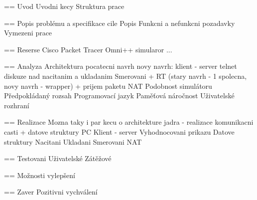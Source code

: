 

== Uvod
Uvodni kecy
Struktura prace

== Popis problému a specifikace cile
Popis
Funkcni a nefunkcni pozadavky
Vymezeni prace

== Reserse
Cisco Packet Tracer
Omni++ simularor
...

== Analyza
Architektura
  pocatecni navrh
  novy navrh: klient - server
  telnet
  diskuze nad nacitanim a ukladanim
  Smerovani + RT (stary navrh - 1 spolecna, novy navrh - wrapper) + prijem paketu
  NAT 
Podobnost simulátoru
Předpokládaný rozsah
Programovací jazyk
Paměťová náročnost
Uživatelské rozhraní

== Realizace
Mozna taky i par kecu o architekture jadra - realizace komunikacni casti + datove struktury PC
  Klient - server
  Vyhodnocovani prikazu
  Datove struktury
Nacitani
Ukladani
Smerovani
NAT

== Testovani
Uživatelské
Zátěžové

== Možnosti vylepšení

== Zaver
Pozitivni vychválení
